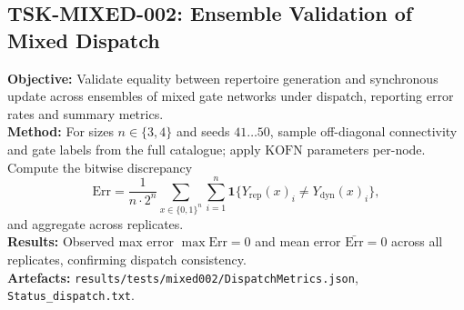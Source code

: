 \documentclass[11pt]{article}
\begin{document}
\subsection{TSK-MIXED-002: Ensemble Validation of Mixed Dispatch}
\textbf{Objective:} Validate equality between repertoire generation and synchronous update across ensembles of mixed gate networks under dispatch, reporting error rates and summary metrics.\\
\textbf{Method:} For sizes \(n\in\{3,4\}\) and seeds \(41\dots 50\), sample off-diagonal connectivity and gate labels from the full catalogue; apply \(\mathrm{KOFN}\) parameters per-node. Compute the bitwise discrepancy
\[
\mathrm{Err} = \frac{1}{n\cdot 2^n} \sum_{x \in \{0,1\}^n} \sum_{i=1}^n \mathbf{1}\big\{Y_{\mathrm{rep}}(x)_i \neq Y_{\mathrm{dyn}}(x)_i\big\},
\]
and aggregate across replicates.\\
\textbf{Results:} Observed max error \(\max\mathrm{Err}=0\) and mean error \(\bar{\mathrm{Err}}=0\) across all replicates, confirming dispatch consistency.\\
\textbf{Artefacts:} \texttt{results/tests/mixed002/DispatchMetrics.json}, \texttt{Status\_dispatch.txt}.
\end{document}
